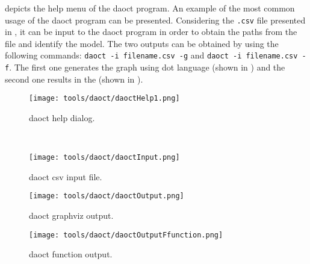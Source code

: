  depicts the help menu of the daoct program. An example of the most common usage of the daoct program can be
presented. Considering the \verb|.csv| file presented in
, it can be input to the daoct program in order to
obtain the paths from the file and identify the \DAOCT{} model. The two outputs
can be obtained by using the following commands: \verb|daoct -i filename.csv -g| and
\verb|daoct -i filename.csv -f|. The first one generates the graph using dot language (shown in
) and the second one results in the \ffunction{} (shown
in ). 

% 

\begin{figure}[H]
  \centering \texttt{[image: tools/daoct/daoctHelp1.png]}
  \caption{daoct help dialog.}
  \label{fig:daoctHelp}
\end{figure}
\
\vspace{-1cm}
\begin{figure}[H]
\begin{minipage}[H]{0.5\textwidth}
  \centering \texttt{[image: tools/daoct/daoctInput.png]}
  \caption{daoct csv input file.}
  \label{fig:daoctInput}
\end{minipage}
\begin{minipage}[H]{0.5\textwidth}
  \centering \texttt{[image: tools/daoct/daoctOutput.png]}
  \caption{daoct graphviz output.}
  \label{fig:daoctOutput}
\end{minipage}
\end{figure}  

\begin{figure}[H]
  \centering
  \texttt{[image: tools/daoct/daoctOutputFfunction.png]}
  \caption{daoct \ffunction{} function output.}
  \label{fig:daoctOutputFfunction}
\end{figure}

% 


